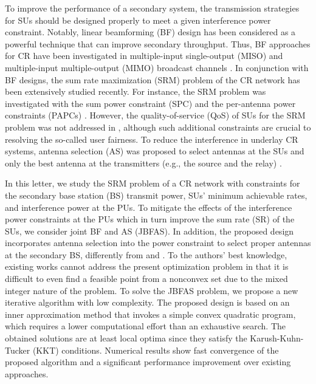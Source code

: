\documentclass[english]{IEEEtran}
\theoremstyle{plain}
\theoremstyle{remark}
\begin{document}
To improve the  performance of a secondary system, the transmission strategies for SUs should be designed properly to meet a given interference power constraint. Notably, linear beamforming (BF) design  has been considered as a powerful technique that can  improve  secondary throughput. Thus, BF approaches for CR have been investigated in multiple-input single-output (MISO) \cite{HeTWC14,MaCL13} and multiple-input multiple-output (MIMO) broadcast channels \cite{Zhang09,ZhangTSP08,NguyenTVT16,NguyenCL16}.
In conjunction with BF designs, the sum rate maximization (SRM) problem of the CR network has been extensively  studied  recently. For instance, the SRM problem was investigated  with the sum power constraint (SPC) \cite{Zhang09,ZhangTSP08} and the per-antenna power constraints (PAPCs) \cite{NguyenTVT16,NguyenCL16}. However, the quality-of-service (QoS) of SUs for the SRM problem was not addressed in \cite{Zhang08,HeTWC14,Zhang09,ZhangTSP08,NguyenTVT16,NguyenCL16}, although such additional constraints are crucial to resolving the so-called user fairness. To reduce  the interference in underlay CR systems, antenna selection (AS) was proposed to select  antennas at the SUs \cite{LiTVT16} and only the best antenna at the transmitters (e.g., the source and the relay) \cite{YeohTVT14}.

In this letter, we study the SRM problem of a  CR network with constraints for  the secondary base station (BS) transmit power, SUs' minimum achievable rates, and interference power at the PUs. To mitigate the effects of the interference power constraints at the PUs which in turn improve the sum rate (SR) of the SUs, we  consider joint BF and AS (JBFAS). In addition, the proposed design  incorporates antenna selection into the power constraint to select  proper antennas at the secondary BS, differently from  \cite{LiTVT16} and \cite{YeohTVT14}.  To the authors' best knowledge, existing works cannot address the present optimization problem in
that it is difficult to even find a feasible point from a nonconvex set due to the mixed integer nature of the problem. To solve the JBFAS problem,  we propose a new iterative algorithm with low complexity. The proposed design is based on an inner approximation method that invokes  a simple convex quadratic program, which requires a lower computational effort than an exhaustive search. The obtained solutions are at least local optima since they satisfy the Karush-Kuhn-Tucker (KKT) conditions.  Numerical results show fast convergence of the proposed algorithm and a significant performance improvement over
existing  approaches.
\end{document}
